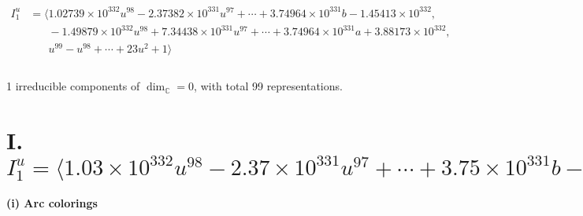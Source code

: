 \documentclass[1p]{elsarticle_modified}
\theoremstyle{definition}
\begin{document}
\begin{align*}
I^u_{1}&=\langle 
1.02739\times10^{332} u^{98}-2.37382\times10^{331} u^{97}+\cdots+3.74964\times10^{331} b-1.45413\times10^{332},\\
\phantom{I^u_{1}}&\phantom{= \langle  }-1.49879\times10^{332} u^{98}+7.34438\times10^{331} u^{97}+\cdots+3.74964\times10^{331} a+3.88173\times10^{332},\\
\phantom{I^u_{1}}&\phantom{= \langle  }u^{99}- u^{98}+\cdots+23 u^2+1\rangle \\
\\
\end{align*}
\raggedright * 1 irreducible components of $\dim_{\mathbb{C}}=0$, with total 99 representations.\\
\newpage
\renewcommand{\arraystretch}{1}
\centering \section*{I. $I^u_{1}= \langle 1.03\times10^{332} u^{98}-2.37\times10^{331} u^{97}+\cdots+3.75\times10^{331} b-1.45\times10^{332},\;-1.50\times10^{332} u^{98}+7.34\times10^{331} u^{97}+\cdots+3.75\times10^{331} a+3.88\times10^{332},\;u^{99}- u^{98}+\cdots+23 u^2+1 \rangle$}
\flushleft \textbf{(i) Arc colorings}\\
\end{document}
